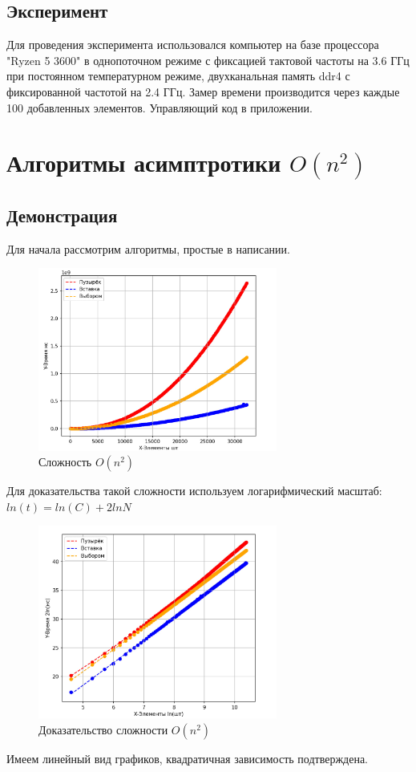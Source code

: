 \documentclass[a4paper,12pt]{article} %
\begin{document}
\subsection{Эксперимент}
Для проведения эксперимента использовался компьютер на базе процессора "Ryzen 5 3600" в однопоточном режиме с фиксацией тактовой частоты на 3.6 ГГц при постоянном температурном режиме, двухканальная память ddr4 с фиксированной частотой на 2.4 ГГц. Замер времени производится через каждые 100 добавленных элементов. Управляющий код в приложении.
\section{Алгоритмы асимптротики $O(n^2)$}
\subsection{Демонстрация}
Для начала рассмотрим алгоритмы, простые в написании.\par
\begin{figure}[H]
    \centering
    \includegraphics[width=0.7\textwidth]{img/first/O2.jpg}
    \caption{Сложность $O(n^2)$}
\end{figure} 
Для доказательства такой сложности используем логарифмический масштаб:
$ln(t)=ln(C)+2lnN$
\begin{figure}[!h]
    \centering
    \includegraphics[width=0.7\textwidth]{img/first/O2ln.jpg}
    \caption{Доказательство сложности $O(n^2)$}
\end{figure} 
Имеем линейный вид графиков, квадратичная зависимость подтверждена.
\end{document}
